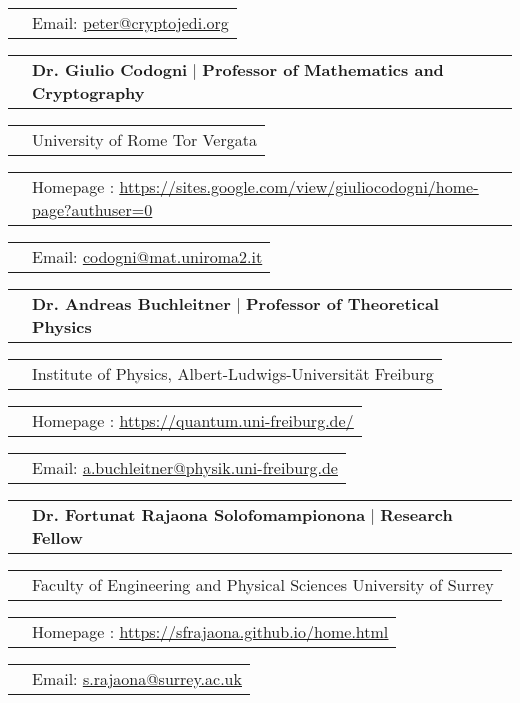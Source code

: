 \documentclass[11pt]{article}
\newcommand{\cvRefTitle}[2]{\begin{tabular}{>{\raggedleft\arraybackslash}p{3cm}>{\raggedright\arraybackslash}p{16cm}}
		 & \textbf{#1} $|$ \textbf{#2}  \\
\end{tabular}}
\newcommand{\cvRefEntry}[1]{\begin{tabular}{>{\raggedleft\arraybackslash}p{3cm}>{\raggedright\arraybackslash}p{16cm}}
		& #1 \\
\end{tabular}}
\begin{document}
\cvRefEntry{Email: \href{mailto:peter@cryptojedi.org}{\color{mauveMoyen}\underline{peter@cryptojedi.org}}}

\vspace*{15pt}

\cvRefTitle{Dr. Giulio Codogni}{Professor of Mathematics and Cryptography}


\cvRefEntry{University of Rome Tor Vergata}


\cvRefEntry{Homepage : \href{https://sites.google.com/view/giuliocodogni/home-page?authuser=0}{\color{mauveMoyen}\underline{https://sites.google.com/view/giuliocodogni/home-page?authuser=0}}}



\cvRefEntry{Email: \href{mailto:codogni@mat.uniroma2.it}{\color{mauveMoyen}\underline{codogni@mat.uniroma2.it}}}

\vspace*{15pt}
\cvRefTitle{Dr. Andreas Buchleitner}{Professor of Theoretical Physics}


\cvRefEntry{Institute of Physics, Albert-Ludwigs-Universität Freiburg}


\cvRefEntry{Homepage : \href{https://quantum.uni-freiburg.de/}{\color{mauveMoyen}\underline{https://quantum.uni-freiburg.de/}}}



\cvRefEntry{Email: \href{mailto:a.buchleitner@physik.uni-freiburg.de}{\color{mauveMoyen}\underline{a.buchleitner@physik.uni-freiburg.de}}}

\vspace*{15pt}
\cvRefTitle{Dr. Fortunat Rajaona Solofomampionona}{Research Fellow}


\cvRefEntry{Faculty of Engineering and Physical Sciences University of Surrey
}


\cvRefEntry{Homepage : \href{https://sfrajaona.github.io/home.html}{\color{mauveMoyen}\underline{https://sfrajaona.github.io/home.html}}}



\cvRefEntry{Email: \href{mailto:s.rajaona@surrey.ac.uk}{\color{mauveMoyen}\underline{s.rajaona@surrey.ac.uk}}}
\end{document}
